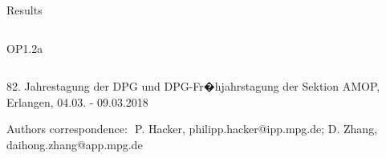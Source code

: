 \documentclass[final]{beamer}
\begin{document}
\begin{frame}
\begin{kasten}{\large Results}
\begin{columns}
\begin{kasten}{\small OP1.2a}
\begin{columns}
            \end{columns}
          \end{kasten}
      \end{columns}%
    \end{kasten}%
%
%
%
    \vfill%
    \centerline{\tiny 82. Jahrestagung der DPG und DPG-Fr�hjahrstagung %
                       der Sektion AMOP, Erlangen, 04.03. - 09.03.2018}%
    \centerline{\tiny Authors correspondence:\,\,%
                P. Hacker, philipp.hacker@ipp.mpg.de; %
                D. Zhang, daihong.zhang@app.mpg.de}%
  \end{frame}%
\end{document}
